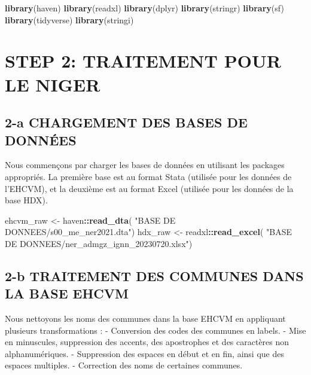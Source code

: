 \documentclass[
]{article}
\newenvironment{Shaded}{\begin{snugshade}}{\end{snugshade}}
\newcommand{\FunctionTok}[1]{\textcolor[rgb]{0.13,0.29,0.53}{\textbf{#1}}}
\newcommand{\NormalTok}[1]{#1}
\newcommand{\OtherTok}[1]{\textcolor[rgb]{0.56,0.35,0.01}{#1}}
\newcommand{\SpecialCharTok}[1]{\textcolor[rgb]{0.81,0.36,0.00}{\textbf{#1}}}
\newcommand{\StringTok}[1]{\textcolor[rgb]{0.31,0.60,0.02}{#1}}
\begin{document}
\begin{Shaded}
\begin{Highlighting}[]
\FunctionTok{library}\NormalTok{(haven)}
\FunctionTok{library}\NormalTok{(readxl)}
\FunctionTok{library}\NormalTok{(dplyr)}
\FunctionTok{library}\NormalTok{(stringr)}
\FunctionTok{library}\NormalTok{(sf)}
\FunctionTok{library}\NormalTok{(tidyverse) }
\FunctionTok{library}\NormalTok{(stringi)}
\end{Highlighting}
\end{Shaded}

\newpage

\section{STEP 2: TRAITEMENT POUR LE
NIGER}\label{step-2-traitement-pour-le-niger}

\subsection{2-a CHARGEMENT DES BASES DE
DONNÉES}\label{a-chargement-des-bases-de-donnuxe9es}

Nous commençons par charger les bases de données en utilisant les
packages appropriés. La première base est au format Stata (utilisée pour
les données de l'EHCVM), et la deuxième est au format Excel (utilisée
pour les données de la base HDX).

\begin{Shaded}
\begin{Highlighting}[]
\NormalTok{ehcvm\_raw }\OtherTok{\textless{}{-}}\NormalTok{ haven}\SpecialCharTok{::}\FunctionTok{read\_dta}\NormalTok{(}
  \StringTok{"BASE DE DONNEES/s00\_me\_ner2021.dta"}\NormalTok{) }
\NormalTok{hdx\_raw }\OtherTok{\textless{}{-}}\NormalTok{ readxl}\SpecialCharTok{::}\FunctionTok{read\_excel}\NormalTok{(}
  \StringTok{"BASE DE DONNEES/ner\_admgz\_ignn\_20230720.xlsx"}\NormalTok{) }
\end{Highlighting}
\end{Shaded}

\subsection{2-b TRAITEMENT DES COMMUNES DANS LA BASE
EHCVM}\label{b-traitement-des-communes-dans-la-base-ehcvm}

Nous nettoyons les noms des communes dans la base EHCVM en appliquant
plusieurs transformations : - Conversion des codes des communes en
labels. - Mise en minuscules, suppression des accents, des apostrophes
et des caractères non alphanumériques. - Suppression des espaces en
début et en fin, ainsi que des espaces multiples. - Correction des noms
de certaines communes.
\end{document}
